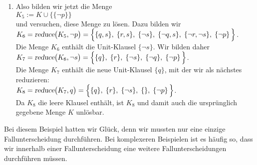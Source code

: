 \begin{enumerate}
\item Also bilden wir jetzt die Menge \\[0.2cm]
      \hspace*{1.3cm} $K_5 := K \cup \bigl\{ \{\neg p\} \bigr\}$ \\[0.2cm]
      und versuchen, diese Menge zu lösen.  Dazu bilden wir
      \\[0.2cm]
      \hspace*{1.3cm} 
      $K_6 = \textsl{reduce}\bigl(K_5, \neg p\bigr) =\Big\{ \{q, s\},\; \{r, s\},\;\{\neg s\},\; \{\neg q, s\},\; \{\neg r, \neg s\},\;\{\neg p\}\, \Big\}$.
      \\[0.2cm]
      Die Menge $K_6$ enthält die  Unit-Klausel $\{\neg s\}$.  Wir bilden daher \\[0.2cm]
      \hspace*{1.3cm} 
      $K_7 = \textsl{reduce}\bigl(K_6, \neg s\bigr) =\Big\{ \{q\},\; \{r\},\;\{\neg s\},\; \{\neg q\},\;\{\neg p\}\, \Big\}$.
      \\[0.2cm]
      Die Menge $K_7$ enthält die neue Unit-Klausel $\{q\}$, mit der wir als nächstes reduzieren:\\[0.2cm]
      \hspace*{1.3cm} 
      $K_8 = \textsl{reduce}\bigl(K_7, q \bigr) =\Big\{ \{q\},\; \{r\},\;\{\neg s\},\; \{\},\;\{\neg p\}\, \Big\}$.
      \\[0.2cm]
      Da $K_8$ die leere Klausel enthält, ist $K_8$ und damit auch die ursprünglich
      gegebene Menge $K$ unlösbar.
\end{enumerate}
Bei diesem Beispiel hatten wir Glück, denn wir mussten nur eine einzige Fallunterscheidung
durchführen. Bei komplexeren Beispielen ist es häufig so, dass wir innerhalb einer Fallunterscheidung eine
weitere Fallunterscheidungen durchführen müssen.

